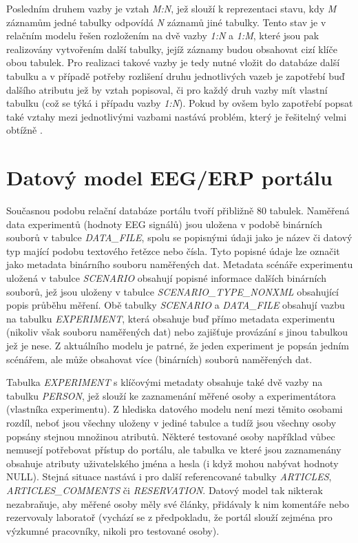 \documentclass{projekt}
\begin{document}
Posledním druhem vazby je vztah {\it M:N}, jež slouží k reprezentaci stavu, kdy {\it M} záznamům jedné tabulky odpovídá {\it N} záznamů jiné tabulky. Tento stav je v relačním modelu řešen rozložením na dvě vazby {\it 1:N} a {\it 1:M}, které jsou pak realizovány vytvořením další tabulky, jejíž záznamy budou obsahovat cizí klíče obou tabulek. Pro realizaci takové vazby je tedy nutné vložit do databáze další tabulku a v případě potřeby rozlišení druhu jednotlivých vazeb je zapotřebí buď dalšího atributu jež by vztah popisoval, či pro každý druh vazby mít vlastní tabulku (což se týká i případu vazby {\it 1:N}). Pokud by ovšem bylo zapotřebí popsat také vztahy mezi jednotlivými vazbami nastává problém, který je řešitelný velmi obtížně \cite{_20}.


\section{Datový model EEG/ERP portálu}
\hspace{0.65cm}Současnou podobu relační databáze portálu tvoří přibližně 80 tabulek. Naměřená data experimentů (hodnoty EEG signálů) jsou uložena v podobě binárních souborů v tabulce {\it DATA\_FILE}, spolu se popisnými údaji jako je název či datový typ mající podobu textového řetězce nebo čísla. Tyto popisné údaje lze označit jako metadata binárního souboru naměřených dat. Metadata scénáře experimentu uložená v tabulce {\it SCENARIO} obsahují popisné informace dalších binárních souborů, jež jsou uloženy v tabulce {\it SCENARIO\_TYPE\_NONXML} obsahující popis průběhu měření. Obě tabulky {\it SCENARIO} a {\it DATA\_FILE} obsahují vazbu na tabulku {\it EXPERIMENT}, která obsahuje buď přímo metadata experimentu (nikoliv však souboru naměřených dat) nebo zajišťuje provázání s jinou tabulkou jež je nese. Z aktuálního modelu je patrné, že jeden experiment je popsán jedním scénářem, ale může obsahovat více (binárních) souborů naměřených dat.

Tabulka {\it EXPERIMENT} s klíčovými metadaty obsahuje také dvě vazby na tabulku {\it PERSON}, jež slouží ke zaznamenání měřené osoby a experimentátora (vlastníka experimentu). Z hlediska datového modelu není mezi těmito osobami rozdíl, neboť jsou všechny uloženy v jediné tabulce a tudíž jsou všechny osoby popsány stejnou množinou atributů. Některé testované osoby například vůbec nemusejí potřebovat přístup do portálu, ale tabulka ve které jsou zaznamenány obsahuje atributy uživatelského jména a hesla (i když mohou nabývat hodnoty NULL). Stejná situace nastává i pro další referencované tabulky {\it ARTICLES}, {\it ARTICLES\_COMMENTS} či {\it RESERVATION}. Datový model tak nikterak nezabraňuje, aby měřené osoby měly své články, přidávaly k nim komentáře nebo rezervovaly laboratoř (vychází se z předpokladu, že portál slouží zejména pro výzkumné pracovníky, nikoli pro testované osoby). 
\end{document}
